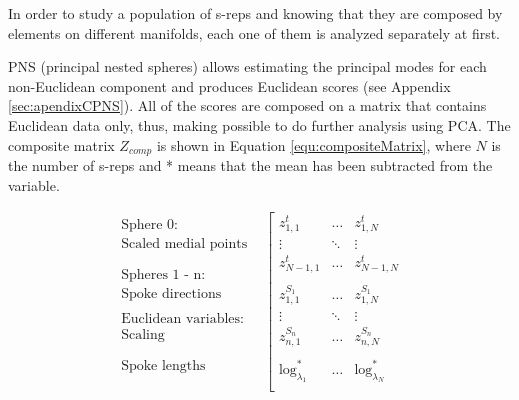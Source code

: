 In order to study a population of s-reps and knowing that 
they are composed by elements on different manifolds, 
each one of them is analyzed separately at first.

PNS (principal nested spheres) \cite{jung_analysis_2012} allows 
estimating the principal modes for each non-Euclidean component
and produces Euclidean scores (see Appendix \ref{sec:apendixCPNS}).
All of the scores are composed on a matrix 
that contains Euclidean data only, thus, 
making possible to do further analysis using PCA. 
The composite matrix $Z_{comp}$ is shown in Equation \ref{equ:compositeMatrix}, where $N$ is the number
of s-reps and * means that the mean has been subtracted from the variable. 

\begin{equation}
\begin{array}{ccc}
         \begin{array}{c}         
          \text{Sphere 0:} \\
          \text{Scaled medial points} \\
           \\
           \\
          \text{Spheres 1 - n:}\\          
          \text{Spoke directions} \\
          \\
          \text{Euclidean variables:}\\
          \text{Scaling}\\
          \\
          \\
          \text{Spoke lengths} \\          
          \\
         \end{array} 
 &
    \left [ \begin{array}{ccc}
          z^t_{1,1} & \hdots & z^t_{1,N} \\
          \vdots    & \ddots & \vdots    \\
          z^t_{N-1,1} & \hdots & z^t_{N-1,N}\\
          \\
          z^{S_1}_{1,1} & \hdots & z^{S_1}_{1,N}\\          
          \vdots    & \ddots & \vdots    \\
          z^{S_n}_{n,1} & \hdots & z^{S_n}_{n,N}\\          
          \\
          \text{log}^*_{\lambda_1} & \hdots & \text{log}^*_{\lambda_N} \\

\end{array}
\end{array}
\end{equation}
